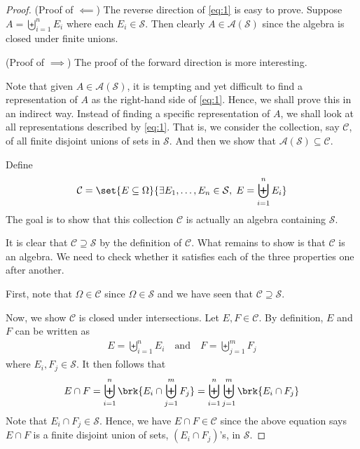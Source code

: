 \documentclass[thmcnt=section, 12pt, color=purple]{my-elegantbook}
\begin{document}
\begin{proof}
	(Proof of $\impliedby$) The reverse direction of \eqref{eq:1}
	is easy to prove. 
	Suppose $A = \biguplus_{i=1}^n E_i$ where each $E_i \in \mathcal{S}$.
	Then clearly $A \in \mathcal{A}(\mathcal{S})$
	since the algebra is closed under finite unions.

	(Proof of $\implies$)
	The proof of the forward direction is more interesting.
	\begin{note}
		Note that given $A \in \mathcal{A}(\mathcal{S})$,
		it is tempting and yet difficult
		to find a representation of $A$
		as the right-hand side of \eqref{eq:1}.
		Hence, we shall prove this in an indirect way.
		Instead of finding a specific representation of $A$,
		we shall look at all representations described by \eqref{eq:1}.
		That is, we consider the collection, say $\mathcal{C}$, 
		of all finite disjoint unions of sets in $\mathcal{S}$.
		And then we show 
		that $\mathcal{A}(\mathcal{S}) \subseteq \mathcal{C}$.
	\end{note}
	\noindent Define 
	\begin{align*}
		\mathcal{C}
		= \set{E \subseteq \Omega}{
			\exists E_1, \ldots, E_n \in \mathcal{S}, \;
			E = \biguplus_{i=1}^n E_i
		}
	\end{align*}
	The goal is to show that this collection $\mathcal{C}$
	is actually an algebra containing $\mathcal{S}$.

	It is clear that $\mathcal{C} \supseteq \mathcal{S}$
	by the definition of $\mathcal{C}$.
	What remains to show is that $\mathcal{C}$
	is an algebra.
	We need to check whether it satisfies
	each of the three properties one after another.

	First, note that $\Omega \in \mathcal{C}$
	since $\Omega \in \mathcal{S}$ 
	and we have seen that $\mathcal{C} \supseteq \mathcal{S}$.

	Now, we show $\mathcal{C}$ is closed under intersections.
	Let $E, F \in \mathcal{C}$.
	By definition, $E$ and $F$ can be written as 
	\begin{align*}
		E = \biguplus_{i=1}^n E_i
		\quad \text{and} \quad 
		F = \biguplus_{j=1}^m F_j
	\end{align*}
	where $E_i, F_j \in \mathcal{S}$.
	It then follows that 
	\begin{align*}
		E \cap F
		= \biguplus_{i=1}^n \brk{
			E_i \cap \biguplus_{j=1}^m F_j
		}
		= \biguplus_{i=1}^n \biguplus_{j=1}^m \brk{E_i \cap F_j}
	\end{align*}
	Note that $E_i \cap F_j \in \mathcal{S}$.
	Hence, we have $E \cap F \in \mathcal{C}$
	since the above equation says $E \cap F$
	is a finite disjoint union of sets, $(E_i \cap F_j)$'s, 
	in $\mathcal{S}$.


\end{proof}
\end{document}
